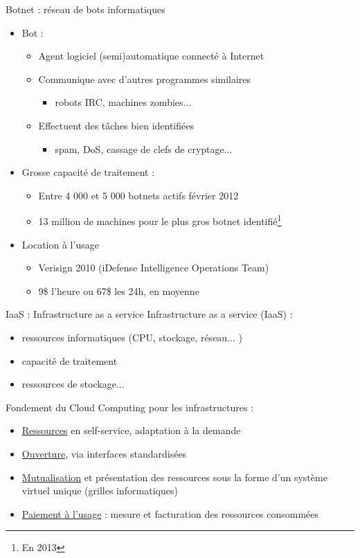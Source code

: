 \begin{frame}{Botnet \cite{wp-botnet} : réseau de bots informatiques}
\begin{itemize}
\item Bot : \begin{itemize}
\item Agent logiciel (semi)automatique connecté à Internet
\item Communique avec d'autres programmes similaires
\begin{itemize}
\item robots IRC, machines zombies...
\end{itemize}
\item Effectuent des tâches bien identifiées
\begin{itemize}
\item spam, DoS, cassage de clefs de cryptage...
\end{itemize}
\end{itemize}

\item Grosse capacité de traitement :
\begin{itemize}
\item Entre 4 000 et 5 000 botnets actifs février 2012
\item 13 million de machines pour le plus gros botnet identifié\footnote{En 2013}
\end{itemize}
\item Location à l'usage
\begin{itemize}
\item Verisign 2010 (iDefense Intelligence Operations Team)
\item 9\$ l'heure ou 67\$ les 24h, en moyenne
\end{itemize}

\end{itemize}
\end{frame}

\begin{frame}{IaaS : Infrastructure as a service \cite{wp-IaaS}}
Infrastructure as a service (IaaS) :
\begin{itemize}
\item ressources informatiques (CPU, stockage, réseau... )
\item capacité de traitement
\item ressources de stockage...
\end{itemize}

Fondement du Cloud Computing\cite{wp-cloud} pour les infrastructures :
\begin{itemize}
\item \underline{Ressources} en self-service, adaptation à la demande
\item \underline{Ouverture}, via interfaces standardisées
\item \underline{Mutualisation} et présentation des ressources sous la forme d'un système virtuel unique (grilles informatiques)
\item \underline{Paiement à l'usage} : mesure et facturation des ressources consommées
\end{itemize}
\end{frame}

